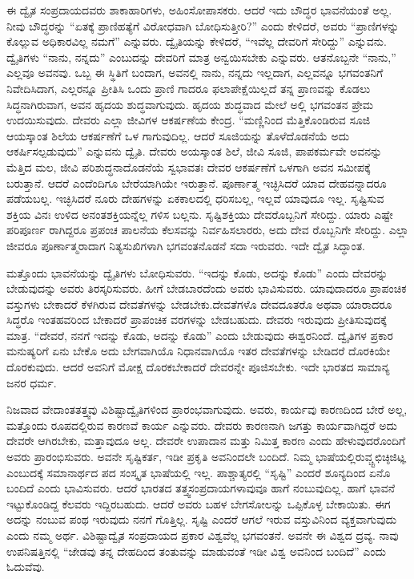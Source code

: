 ಈ ದ್ವೈತ ಸಂಪ್ರದಾಯದವರು ಶಾಕಾಹಾರಿಗಳು, ಅಹಿಂಸೋಪಾಸಕರು. ಆದರೆ ಇದು ಬೌದ್ಧರ ಭಾವನೆಯಂತೆ ಅಲ್ಲ. ನೀವು ಬೌದ್ಧರನ್ನು “ಏತಕ್ಕೆ ಪ್ರಾಣಿಹತ್ಯೆಗೆ ವಿರೋಧವಾಗಿ ಬೋಧಿಸುತ್ತೀರಿ?” ಎಂದು ಕೇಳಿದರೆ, ಅವರು “ಪ್ರಾಣಿಗಳನ್ನು ಕೊಲ್ಲುವ ಅಧಿಕಾರವಿಲ್ಲ ನಮಗೆ” ಎನ್ನುವರು. ದ್ವೈತಿಯನ್ನು ಕೇಳಿದರೆ, “ಇವೆಲ್ಲ ದೇವರಿಗೆ ಸೇರಿದ್ದು” ಎನ್ನುವನು. ದ್ವೈತಿಗಳು “ನಾನು, ನನ್ನದು” ಎಂಬುದನ್ನು ದೇವರಿಗೆ ಮಾತ್ರ ಅನ್ವಯಿಸಬೇಕು ಎನ್ನುವರು. ಆತನೊಬ್ಬನೇ “ನಾನು,” ಎಲ್ಲವೂ ಅವನವು. ಒಬ್ಬ ಈ ಸ್ಥಿತಿಗೆ ಬಂದಾಗ, ಅವನಲ್ಲಿ ನಾನು, ನನ್ನದು ಇಲ್ಲದಾಗ, ಎಲ್ಲವನ್ನೂ ಭಗವಂತನಿಗೆ ನಿವೇದಿಸಿದಾಗ, ಎಲ್ಲರನ್ನೂ ಪ್ರೀತಿಸಿ ಒಂದು ಪ್ರಾಣಿ ಗಾದರೂ ಫಲಾಪೇಕ್ಷೆಯಿಲ್ಲದೆ ತನ್ನ ಪ್ರಾಣವನ್ನು ಕೊಡಲು ಸಿದ್ಧನಾಗಿರುವಾಗ, ಅವನ ಹೃದಯ ಶುದ್ಧವಾಗುವುದು. ಹೃದಯ ಶುದ್ಧವಾದ ಮೇಲೆ ಅಲ್ಲಿ ಭಗವಂತನ ಪ್ರೇಮ ಉದಯಿಸುವುದು. ದೇವರು ಎಲ್ಲಾ ಜೀವಿಗಳ ಆಕರ್ಷಣೆಯ ಕೇಂದ್ರ. “ಮಣ್ಣಿನಿಂದ ಮೆತ್ತಿಕೊಂಡಿರುವ ಸೂಜಿ ಆಯಸ್ಕಾಂತ ಶಿಲೆಯ ಆಕರ್ಷಣೆಗೆ ಒಳ ಗಾಗುವುದಿಲ್ಲ. ಆದರೆ ಸೂಜಿಯನ್ನು ತೊಳೆದೊಡನೆಯೆ ಅದು ಆಕರ್ಷಿಸಲ್ಪಡುವುದು” ಎನ್ನುವನು ದ್ವೈತಿ. ದೇವರು ಅಯಸ್ಕಾಂತ ಶಿಲೆ, ಜೀವಿ ಸೂಜಿ, ಪಾಪಕರ್ಮವೇ ಅವನನ್ನು ಮೆತ್ತಿದ ಮಲ, ಜೀವಿ ಪರಿಶುದ್ಧನಾದೊಡನೆಯೆ ಸ್ವಭಾವತಃ ದೇವರ ಆಕರ್ಷಣೆಗೆ ಒಳಗಾಗಿ ಅವನ ಸಮೀಪಕ್ಕೆ ಬರುತ್ತಾನೆ. ಆದರೆ ಎಂದೆಂದಿಗೂ ಬೇರೆಯಾಗಿಯೇ ಇರುತ್ತಾನೆ. ಪೂರ್ಣಾತ್ಮ ಇಚ್ಛಿಸಿದರೆ ಯಾವ ದೇಹವನ್ನಾದರೂ ಪಡೆಯಬಲ್ಲ. ಇಚ್ಛಿಸಿದರೆ ನೂರು ದೇಹಗಳನ್ನು ಏಕಕಾಲದಲ್ಲಿ ಧರಿಸಬಲ್ಲ, ಇಲ್ಲವೆ ಯಾವುದೂ ಇಲ್ಲ. ಸೃಷ್ಟಿಸುವ ಶಕ್ತಿಯ ವಿನಃ ಉಳಿದ ಅನಂತಶಕ್ತಿಯನ್ನೆಲ್ಲ ಗಳಿಸ ಬಲ್ಲನು. ಸೃಷ್ಟಿಶಕ್ತಿಯು ದೇವರೊಬ್ಬನಿಗೆ ಸೇರಿದ್ದು. ಯಾರು ಎಷ್ಟೇ ಪರಿಪೂರ್ಣ ರಾಗಿದ್ದರೂ ಪ್ರಪಂಚ ಪಾಲನೆಯ ಕೆಲಸವನ್ನು ನಿರ್ವಹಿಸಲಾರರು, ಅದು ದೇವ ರೊಬ್ಬನಿಗೇ ಸೇರಿದ್ದು. ಎಲ್ಲಾ ಜೀವರೂ ಪೂರ್ಣಾತ್ಮರಾದಾಗ ನಿತ್ಯಸುಖಿಗಳಾಗಿ ಭಗವಂತನೊಡನೆ ಸದಾ ಇರುವರು. ಇದೇ ದ್ವೈತ ಸಿದ್ಧಾಂತ.

ಮತ್ತೊಂದು ಭಾವನೆಯನ್ನು ದ್ವೈತಿಗಳು ಬೋಧಿಸುವರು. “ಇದನ್ನು ಕೊಡು, ಅದನ್ನು ಕೊಡು” ಎಂದು ದೇವರನ್ನು ಬೇಡುವುದನ್ನು ಅವರು ತಿರಸ್ಕರಿಸುವರು. ಹೀಗೆ ಬೇಡಬಾರದೆಂದು ಅವರು ಭಾವಿಸುವರು. ಯಾವುದಾದರೂ ಪ್ರಾಪಂಚಿಕ ವಸ್ತುಗಳು ಬೇಕಾದರೆ ಕೆಳಗಿರುವ ದೇವತೆಗಳನ್ನು ಬೇಡಬೇಕು.ದೇವತೆಗಳೊ ದೇವದೂತರೊ ಅಥವಾ ಯಾರಾದರೂ ಸಿದ್ಧರೊ ಇಂತಹವರಿಂದ ಬೇಕಾದರೆ ಪ್ರಾಪಂಚಿಕ ವರಗಳನ್ನು ಬೇಡಬಹುದು. ದೇವರು ಇರುವುದು ಪ್ರೀತಿಸುವುದಕ್ಕೆ ಮಾತ್ರ. “ದೇವರೆ, ನನಗೆ ಇದನ್ನು ಕೊಡು, ಅದನ್ನು ಕೊಡು” ಎಂದು ಬೇಡುವುದು ಈಶ್ವರನಿಂದೆ. ದ್ವೈತಿಗಳ ಪ್ರಕಾರ ಮನುಷ್ಯರಿಗೆ ಏನು ಬೇಕೊ ಅದು ಬೇಗವಾಗಿಯೊ ನಿಧಾನವಾಗಿಯೊ ಇತರ ದೇವತೆಗಳನ್ನು ಬೇಡಿದರೆ ದೊರಕಿಯೇ ದೊರಕುವುದು. ಆದರೆ ಅವನಿಗೆ ಮೋಕ್ಷ ದೊರಕಬೇಕಾದರೆ ದೇವರನ್ನೇ ಪೂಜಿಸಬೇಕು. ಇದೇ ಭಾರತದ ಸಾಮಾನ್ಯ ಜನರ ಧರ್ಮ.

ನಿಜವಾದ ವೇದಾಂತತತ್ತ್ವವು ವಿಶಿಷ್ಟಾದ್ವೈತಿಗಳಿಂದ ಪ್ರಾರಂಭವಾಗುವುದು. ಅವರು, ಕಾರ್ಯವು ಕಾರಣದಿಂದ ಬೇರೆ ಅಲ್ಲ, ಮತ್ತೊಂದು ರೂಪದಲ್ಲಿರುವ ಕಾರಣವೆ ಕಾರ್ಯ ಎನ್ನುವರು. ದೇವರು ಕಾರಣನಾಗಿ ಜಗತ್ತು ಕಾರ್ಯವಾಗಿದ್ದರೆ ಅದು ದೇವರೇ ಆಗಿರಬೇಕು, ಮತ್ತಾವುದೂ ಅಲ್ಲ. ದೇವರೇ ಉಪಾದಾನ ಮತ್ತು ನಿಮಿತ್ತ ಕಾರಣ ಎಂದು ಹೇಳುವುದರೊಂದಿಗೆ ಅವರು ಪ್ರಾರಂಭಿಸುವರು. ಅವನೇ ಸೃಷ್ಟಿಕರ್ತ, ಇಡೀ ಪ್ರಕೃತಿ ಅವನಿಂದಲೇ ಬಂದಿದೆ. ನಿಮ್ಮ ಭಾಷೆಯಲ್ಲಿರುವ್ಚ್ಟಛಿಚ್ಠಿಜಿಟ್ಞ ಎಂಬುದಕ್ಕೆ ಸಮಾನಾರ್ಥದ ಪದ ಸಂಸ್ಕೃತ ಭಾಷೆಯಲ್ಲಿ ಇಲ್ಲ. ಪಾಶ್ಚಾತ್ಯರಲ್ಲಿ “ಸೃಷ್ಟಿ” ಎಂದರೆ ಶೂನ್ಯದಿಂದ ಏನೊ ಬಂದಿದೆ ಎಂದು ಭಾವಿಸುವರು. ಆದರೆ ಭಾರತದ ತತ್ತ್ವಸಂಪ್ರದಾಯಗಳಾವುವೂ ಹಾಗೆ ನಂಬುವುದಿಲ್ಲ. ಹಾಗೆ ಭಾವನೆ ಇಟ್ಟುಕೊಂಡಿದ್ದ ಕೆಲವರು ಇದ್ದಿರಬಹುದು. ಆದರೆ ಅವರು ಬಹಳ ಬೇಗಸೋಲನ್ನು ಒಪ್ಪಿಕೊಳ್ಳ ಬೇಕಾಯಿತು. ಈಗ ಅದನ್ನು ನಂಬುವ ಪಂಥ ಇರುವುದು ನನಗೆ ಗೊತ್ತಿಲ್ಲ. ಸೃಷ್ಟಿ ಎಂದರೆ ಆಗಲೆ ಇರುವ ವಸ್ತುವಿನಿಂದ ವ್ಯಕ್ತವಾಗುವುದು ಎಂದು ನಮ್ಮ ಅರ್ಥ. ವಿಶಿಷ್ಟಾದ್ವೈತ ಸಂಪ್ರದಾಯದ ಪ್ರಕಾರ ವಿಶ್ವವೆಲ್ಲ ಭಗವಂತನೆ. ಅವನೇ ಈ ವಿಶ್ವದ ದ್ರವ್ಯ. ನಾವು ಉಪನಿಷತ್ತಿನಲ್ಲಿ “ಜೇಡವು ತನ್ನ ದೇಹದಿಂದ ತಂತುವನ್ನು ಮಾಡುವಂತೆ ಇಡೀ ವಿಶ್ವ ಅವನಿಂದ ಬಂದಿದೆ” ಎಂದು ಓದುವೆವು.

